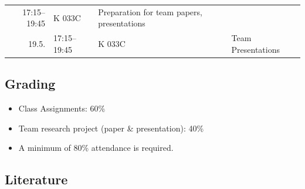 \documentclass[]{article}
\providecommand{\tightlist}{%
  \setlength{\itemsep}{0pt}\setlength{\parskip}{0pt}}
\begin{document}
\begin{longtable}[c]{@{}rlll@{}}
\begin{minipage}[t]{0.15\columnwidth}
17:15--19:45
\strut\end{minipage} &
\begin{minipage}[t]{0.13\columnwidth}\raggedright\strut
K 033C
\strut\end{minipage} &
\begin{minipage}[t]{0.51\columnwidth}\raggedright\strut
Preparation for team papers, presentations
\strut\end{minipage}\tabularnewline
\begin{minipage}[t]{0.09\columnwidth}\raggedleft\strut
19.5.
\strut\end{minipage} &
\begin{minipage}[t]{0.15\columnwidth}\raggedright\strut
17:15--19:45
\strut\end{minipage} &
\begin{minipage}[t]{0.13\columnwidth}\raggedright\strut
K 033C
\strut\end{minipage} &
\begin{minipage}[t]{0.51\columnwidth}\raggedright\strut
Team Presentations
\strut\end{minipage}\tabularnewline
\bottomrule
\end{longtable}

\subsection{Grading}\label{grading}

\begin{itemize}
\tightlist
\item
  Class Assignments: 60\%
\item
  Team research project (paper \& presentation): 40\%
\item
  A minimum of 80\% attendance is required.
\end{itemize}

\subsection{Literature}\label{literature}
\end{document}
